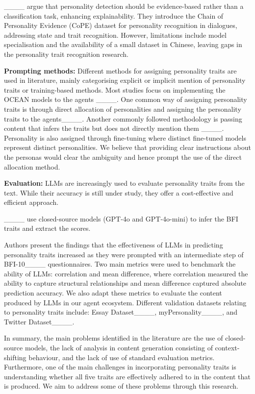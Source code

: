 ____ argue that personality detection should be evidence-based rather than a classification task, enhancing explainability. They introduce the Chain of Personality Evidence (CoPE) dataset for personality recognition in dialogues, addressing state and trait recognition. However, limitations include model specialisation and the availability of a small dataset in Chinese, leaving gaps in the personality trait recognition research.



\noindent\textbf{Prompting methods:} Different methods for assigning personality traits are used in literature, mainly categorising explicit or implicit mention of personality traits or training-based methods. Most studies focus on implementing the OCEAN models to the agents ____. One common way of assigning personality traits is through direct allocation of personalities and assigning the personality traits to the agents____. Another commonly followed methodology is passing content that infers the traits but does not directly mention them ____. Personality is also assigned through fine-tuning where distinct fine-tuned models represent distinct personalities. We believe that providing clear instructions about the personas would clear the ambiguity and hence prompt the use of the direct allocation method. 

\noindent\textbf{Evaluation:} LLMs are increasingly used to evaluate personality traits from the text. While their accuracy is still under study, they offer a cost-effective and efficient approach.

____ use closed-source models (GPT-4o and GPT-4o-mini) to infer the BFI traits and extract the scores. 

Authors present the findings that the effectiveness of LLMs in predicting personality traits increased as they were prompted with an intermediate step of BFI-10____ questionnaires. Two main metrics were used to benchmark the ability of LLMs: correlation and mean difference, where correlation measured the ability to capture structural relationships and mean difference captured absolute prediction accuracy. We also adapt these metrics to evaluate the content produced by LLMs in our agent ecosystem. Different validation datasets relating to personality traits include: Essay Dataset____, myPersonality____, and Twitter Dataset____.
 

In summary, the main problems identified in the literature are the use of closed-source models, the lack of analysis in content generation consisting of context-shifting behaviour, and the lack of use of standard evaluation metrics. Furthermore, one of the main challenges in incorporating personality traits is understanding whether all five traits are effectively adhered to in the content that is produced. We aim to address some of these problems through this research.